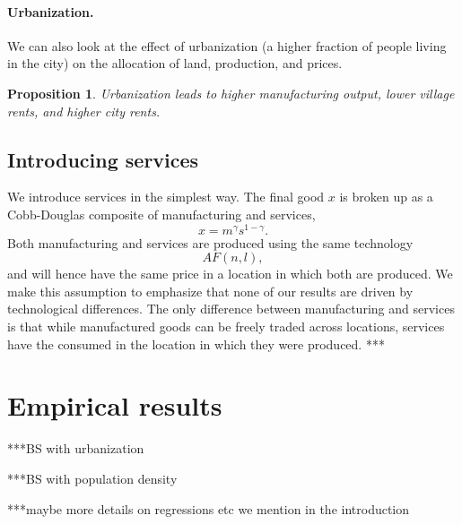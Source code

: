 \documentclass[12pt]{article}
\newtheorem{proposition}{Proposition}
\begin{document}
\paragraph{Urbanization.} 
We can also look at the effect of urbanization (a higher fraction of people living in the city) on the allocation of land, production, and prices.

\begin{proposition}
Urbanization leads to higher manufacturing output, lower village rents, and higher city rents.
\end{proposition}

\subsection{Introducing services}
We introduce services in the simplest way. The final good $x$ is broken up as a Cobb-Douglas composite of manufacturing and services,
\[
x = m^\gamma s^{1-\gamma}.
\]
Both manufacturing and services are produced using the same technology 
\[
AF(n,l),
\]
and will hence have the same price in a location in which both are produced. We make this assumption to emphasize that none of our results are driven by technological differences. The only difference between manufacturing and services is that while manufactured goods can be freely traded across locations, services have the consumed in the location in which they were produced.
***

\section{Empirical results}
***BS with urbanization

***BS with population density

***maybe more details on regressions etc we mention in the introduction
\end{document}
